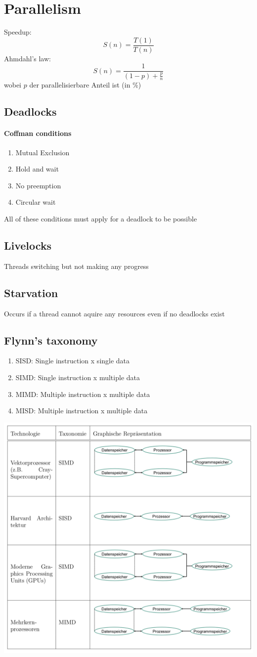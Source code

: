 \section{Parallelism}
Speedup:
$$S(n) = \frac{T(1)}{T(n)}$$
Ahmdahl's law:
$$ S(n) = \frac{1}{(1 - p)+\frac{p}{n}}$$
wobei $p$ der parallelisierbare Anteil ist (in \%)
\subsection{Deadlocks}
\paragraph{Coffman conditions}
\begin{enumerate}
	\item Mutual Exclusion
	\item Hold and wait
	\item No preemption
	\item Circular wait
\end{enumerate}
All of these conditions must apply for a deadlock to be possible
\subsection{Livelocks}
Threads switching but not making any progress
\subsection{Starvation}
Occurs if a thread cannot aquire any resources even if no deadlocks exist

\subsection{Flynn's taxonomy}

\begin{enumerate}
	\item SISD: Single instruction x single data
	\item SIMD: Single instruction x multiple data
	\item MIMD: Multiple instruction x multiple data	
	\item MISD: Multiple instruction x multiple data
\end{enumerate}

\includegraphics[width=\columnwidth]{images/flynn.png}